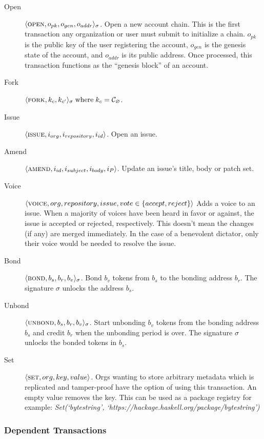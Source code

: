 \begin{description}
    \item[Open] $\langle \text{\normalfont\scshape open}, o_{pk}, o_{gen}, o_{addr} \rangle_{\sigma}$.
        Open a new account chain. This is the first transaction any
        organization or user must submit to initialize a chain.  $o_{pk}$ is
        the public key of the user registering the account, $o_{gen}$ is the
        genesis state of the account, and $o_{addr}$ is its public address.
        Once processed, this transaction functions as the ``genesis block'' of
        an account.
    \item[Fork] $\langle \text{\normalfont\scshape fork}, k_c, k_{c'} \rangle_\sigma \; \text{where} \; k_c =
        \mathcal{C}_{\varnothing}$.
    \item[Issue] $\langle \text{\normalfont\scshape issue}, i_{org}, i_{repository}, i_{id} \rangle$. Open an issue.
    \item[Amend] $\langle \text{\normalfont\scshape amend}, i_{id}, i_{subject}, i_{body}, i_P \rangle$.
        Update an issue's title, body or patch set.
    \item[Voice] $\langle \text{\normalfont\scshape voice}, org, repository, issue, vote \in \{accept, reject\} \rangle$
        Adds a voice to an issue. When a majority of voices have been heard in
        favor or against, the issue is accepted or rejected, respectively. This
        doesn’t mean the changes (if any) are merged immediately. In the case
        of a benevolent dictator, only their voice would be needed to resolve
        the issue.
    \item[Bond] $\langle \text{\normalfont\scshape bond}, b_{s}, b_{r}, b_{v} \rangle_{\sigma}$. Bond
        $b_v$ tokens from $b_{s}$ to the bonding address $b_r$. The signature
        $\sigma$ unlocks the address $b_s$.
    \item[Unbond] $\langle \text{\normalfont\scshape unbond}, b_{s}, b_{r}, b_{v} \rangle_{\sigma}$. Start unbonding
        $b_v$ tokens from the bonding address $b_{s}$ and credit $b_r$ when
        the unbonding period is over. The signature $\sigma$ unlocks the
        bonded tokens in $b_s$.
    \item[Set] $\langle \text{\normalfont\scshape set}, org, key, value \rangle$. Orgs wanting to store
        arbitrary metadata which is replicated and tamper-proof have the option
        of using this transaction. An empty value removes the key. This can be
        used as a package registry for example: \emph{Set(`bytestring',
        `https://hackage.haskell.org/package/bytestring')}
\end{description}

\subsubsection{Dependent Transactions}

